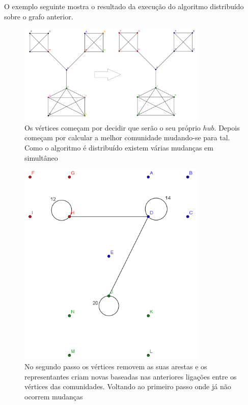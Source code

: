 O exemplo seguinte mostra o resultado da execução do algoritmo distribuído sobre o grafo anterior.

\begin{figure}[h]
\centering
\includegraphics[width=90mm]{graphd1}
\caption*{Os vértices começam por decidir que serão o seu próprio $hub$. Depois começam por calcular a melhor comunidade mudando-se para tal. Como o algoritmo é distribuído existem várias mudanças em simultâneo}
\end{figure}
\begin{figure}[h]
\includegraphics[width=90mm]{graphd2}
\caption*{No segundo passo os vértices removem as suas arestas e os representantes criam novas baseadas nas anteriores ligações entre os vértices das comunidades. Voltando ao primeiro passo onde já não ocorrem mudanças}
\end{figure}